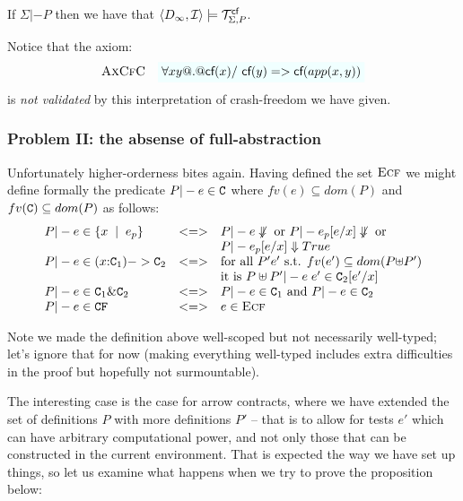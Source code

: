 \documentclass[preprint,nocopyrightspace,draft]{sigplanconf}
\begin{document}
\begin{theorem}
If $\Sigma |- P$ then we have that $\langle D_{\infty},{\cal I}\rangle \models {\cal T}_{\Sigma,P}^{\textsf{cf}}$.
\end{theorem}

Notice that the axiom:
\[  \textsc{AxCfC}  \quad \formula{\forall x y @.@ \lcf{x} /\ \lcf{y} => \lcf{app(x,y)}} \]
is {\em not validated} by this interpretation of crash-freedom we have given. 


\subsubsection{Problem II: the absense of full-abstraction}

Unfortunately higher-orderness bites again. Having defined the set $\textsc{Ecf}$ we might define formally
the predicate $P |- e \in {\tt C}$ where $fv(e) \subseteq dom(P)$ and $fv({\tt C}) \subseteq dom(P)$ as 
follows:
{\setlength{\arraycolsep}{2pt}
\[\begin{array}{lcl}
    P |- e \in \{ x\;\mid\;e_p\} & <=> & P |- e \not\Downarrow \mbox{ or } P |- e_p[e/x] \not\Downarrow \mbox{ or} \\ 
                                 &     & P |- e_p[e/x] \Downarrow True \\
    P |- e \in (x{:}{\tt C}_1) -> {\tt C}_2 & <=> & 
                                 \mbox{for all } P' e' \mbox{ s.t. } fv(e') \subseteq dom(P{\uplus}P')  \\ 
                                   &   &  \mbox{it is } P\uplus P' |- e\;e' \in {\tt C}_2[e'/x] \\
    P |- e \in {\tt C}_1 \& {\tt C}_2 & <=> & P |- e \in {\tt C}_1 \mbox{ and } P |- e \in {\tt C}_2 \\
    P |- e \in {\tt CF}            & <=> & e \in \textsc{Ecf} 
\end{array}\]}

Note we made the definition above well-scoped but not necessarily well-typed; let's ignore that for now (making everything
well-typed includes extra difficulties in the proof but hopefully not surmountable).

The interesting case is the case for arrow contracts, where we have extended the set of definitions $P$ with more 
definitions $P'$ -- that is to allow for tests $e'$ which can have arbitrary computational power, and not only those
that can be constructed in the current environment. That is expected the way we have set up things, so let us examine
what happens when we try to prove the proposition below:
\end{document}
